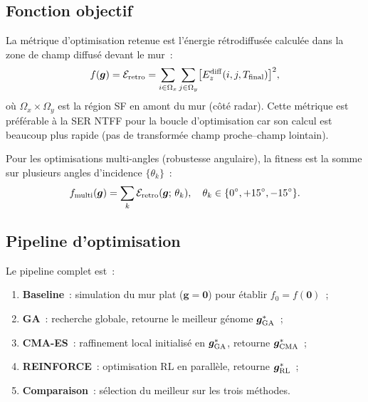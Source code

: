 \documentclass[12pt,a4paper]{article}
\begin{document}
\subsection{Fonction objectif}
\label{ssec:fitness}

La métrique d'optimisation retenue est l'énergie rétrodiffusée calculée dans la
zone de champ diffusé devant le mur~:
\begin{equation}
    f(\bm{g}) = \mathcal{E}_{\rm retro} =
    \sum_{i \in \Omega_x} \sum_{j \in \Omega_y}
    \bigl[E_z^{\rm diff}(i, j, T_{\rm final})\bigr]^2,
    \label{eq:fitness-detail}
\end{equation}
où $\Omega_x \times \Omega_y$ est la région SF en amont du mur (côté radar).
Cette métrique est préférable à la SER NTFF pour la boucle d'optimisation car
son calcul est beaucoup plus rapide (pas de transformée champ proche--champ lointain).

Pour les optimisations multi-angles (robustesse angulaire), la fitness est la somme
sur plusieurs angles d'incidence $\{\theta_k\}$~:
\begin{equation}
    f_{\rm multi}(\bm{g}) = \sum_k \mathcal{E}_{\rm retro}(\bm{g};\,\theta_k),
    \quad \theta_k \in \{0^\circ, +15^\circ, -15^\circ\}.
    \label{eq:fitness-multi}
\end{equation}

\subsection{Pipeline d'optimisation}

Le pipeline complet est~:
\begin{enumerate}
    \item \textbf{Baseline}~: simulation du mur plat ($\bm{g} = \bm{0}$) pour
          établir $f_0 = f(\bm{0})$~;
    \item \textbf{GA}~: recherche globale, retourne le meilleur génome
          $\bm{g}^*_{\rm GA}$~;
    \item \textbf{CMA-ES}~: raffinement local initialisé en $\bm{g}^*_{\rm GA}$,
          retourne $\bm{g}^*_{\rm CMA}$~;
    \item \textbf{REINFORCE}~: optimisation RL en parallèle, retourne
          $\bm{g}^*_{\rm RL}$~;
    \item \textbf{Comparaison}~: sélection du meilleur sur les trois méthodes.
\end{enumerate}
\end{document}
